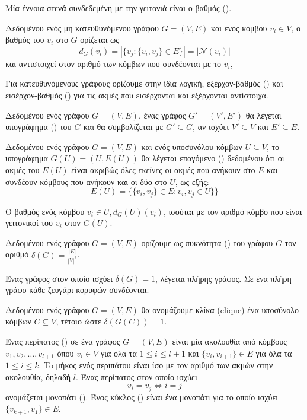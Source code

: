Μία έννοια στενά συνδεδεμένη με την γειτονιά είναι ο βαθμός ().
\begin{definition}[Βαθμός]
Δεδομένου ενός μη κατευθυνόμενου γράφου $G = ( V, E )$ και ενός κόμβου $v_{i} \in V$, ο βαθμός του $v_{i}$ στο $G$ ορίζεται ως $$d_{G} ( v_{i} ) = |\{ v_{j} : \{ v_{i} , v_{j} \} \in E \}| = |\mathcal{N} ( v_{i} )|$$ και αντιστοιχεί στον αριθμό των κόμβων που συνδέονται με το $v_{i}$,
\end{definition}
Για κατευθυνόμενους γράφους ορίζουμε στην ίδια λογική, εξέρχον-βαθμός () και εισέρχον-βαθμός () για τις ακμές που εισέρχονται και εξέρχονται αντίστοιχα.
\begin{definition}[Υπογράφημα]
Δεδομένου ενός γράφου $G = ( V, E )$, ένας γράφος $G' = ( V', E')$ θα λέγεται υπογράφημα () του $G$ και θα συμβολίζεται με $G' \subseteq G$, αν ισχύει $V' \subseteq V$ και $E' \subseteq E$.
\label{def:subgraph}
\end{definition}
\begin{definition}
Δεδομένου ενός γράφου $G = ( V, E )$ και ενός υποσυνόλου κόμβων $U \subseteq V$, το υπογράφημα $G(U) = (U, E(U))$ θα λέγεται επαγόμενο () δεδομένου ότι οι ακμές του $E(U)$ είναι ακριβώς όλες εκείνες οι ακμές που ανήκουν στο $E$ και συνδέουν κόμβους που ανήκουν και οι δύο στο $U$, ως εξής:
\begin{equation}
    E(U) = \{\{v_{i},v_{j}\}\in E: v_{i}, v_{j}\in U\}\}
\end{equation}
\label{def:induced_subgraph}
\end{definition}
Ο βαθμός ενός κόμβου $v_{i} \in U, d_{G}(U)(v_{i})$, ισούται με τον αριθμό κόμβο που είναι γειτονικοί του $v_{i}$ στον $G(U)$.
\begin{definition}[Πυκνότητα]
Δεδομένου ενός γράφου $G = ( V, E )$ ορίζουμε ως πυκνότητα () του γράφου $G$ τον αριθμό $\delta(G) = \frac{|E|}{|V|^{2}}$.
\end{definition}
Ένας γράφος στον οποίο ισχύει $\delta(G) = 1$, λέγεται πλήρης γράφος. Σε ένα πλήρη γράφο κάθε ζευγάρι κορυφών συνδέονται.
\begin{definition}[Κλίκα]
Δεδομένου ενός γράφου $G = ( V, E )$ θα ονομάζουμε κλίκα (clique) ένα υποσύνολο κόμβων $C \subseteq V$, τέτοιο ώστε $\delta(G(C)) = 1$.
\end{definition}
\begin{definition}
Ένας περίπατος () σε ένα γράφος $G = (V, E)$ είναι μία ακολουθία από κόμβους $v_{1}, v_{2}, \dots , v_{l + 1}$ όπου $v_{i} \in V$ για όλα τα $1 \leq i \leq l + 1$ και $\{ v_{i} , v_{i + 1} \} \in E$ για όλα τα
$1 \leq i \leq k$. To μήκος ενός περιπάτου είναι ίσο με τον αριθμό των ακμών στην ακολουθία, δηλαδή $l$.
Ένας περίπατος στον οποίο ισχύει $$v_{i} = v_{j} \Leftrightarrow i = j$$ ονομάζεται μονοπάτι ().
Ένας κύκλος () είναι ένα μονοπάτι για το οποίο ισχύει $\{v_{k + 1}, v_{1}\} \in E$.
\end{definition}
